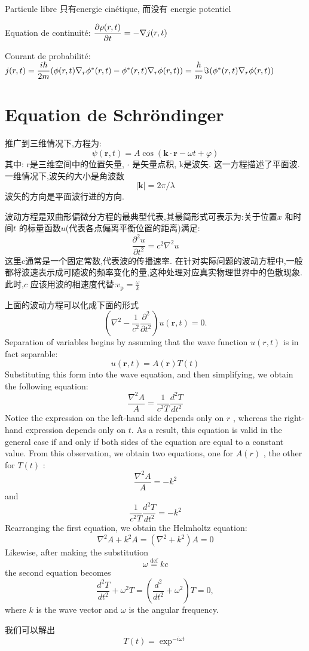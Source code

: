 \documentclass{article}
\begin{document}
Particule libre 只有energie cin\'etique, 而没有 energie potentiel

Equation de continuit\'e: $\dfrac{\partial \rho(r,t)}{\partial t} = - \nabla j(r,t)$

Courant de probabilit\'e: $j(r,t) = \dfrac{i\hbar}{2m} (\phi(r,t) \nabla _r{\phi^*(r,t)} - \phi^*(r,t) \nabla _r{\phi(r,t)}) = \dfrac{\hbar}{m} \Im{(\phi^*(r,t) \nabla _r{\phi(r,t)})} $

\section{Equation de Schr\"ondinger}
推广到三维情况下,方程为:
$$
\psi \left({\mathbf r}, t \right) = A \cos \left({\mathbf k} \cdot {\mathbf r} - \omega t + \varphi \right)
$$
其中:
r是三维空间中的位置矢量,
$\cdot$ 是矢量点积,
k是波矢.
这一方程描述了平面波.一维情况下,波矢的大小是角波数
$$|{\mathbf k}| = 2\pi/\lambda$$
波矢的方向是平面波行进的方向.

波动方程是双曲形偏微分方程的最典型代表,其最简形式可表示为:关于位置$x$ 和时间$t$ 的标量函数$u$(代表各点偏离平衡位置的距离)满足:
$$
\dfrac{\partial^2 u}{\partial t^2} = c^2 \nabla^2u
$$
这里c通常是一个固定常数,代表波的传播速率.
在针对实际问题的波动方程中,一般都将波速表示成可随波的频率变化的量,这种处理对应真实物理世界中的色散现象.此时,$ c$  应该用波的相速度代替:$v_\mathrm{p} = \frac{\omega}{k}$

上面的波动方程可以化成下面的形式
$$
\left(\nabla^2-\frac{1}{c^2}\frac{\partial^2}{\partial{t}^2}\right)u(\mathbf{r},t)=0.
$$
Separation of variables begins by assuming that the wave function $u(r, t)$ is in fact separable:
$$u(\mathbf{r},t)=A (\mathbf{r}) T(t)$$
Substituting this form into the wave equation, and then simplifying, we obtain the following equation:
$$\dfrac{\nabla^2 A}{A} = \dfrac{1}{c^2 T } \dfrac{d^2 T}{d t^2}$$
Notice the expression on the left-hand side depends only on $r$ , whereas the right-hand expression depends only on $t$.
As a result, this equation is valid in the general case if and only if both sides of the equation are equal to a constant value.
From this observation, we obtain two equations, one for $A(r)$ , the other for $T(t)$ :
$$\dfrac{\nabla^2 A}{A} = -k^2$$
and
$$\dfrac{1}{c^2 T } \dfrac{d^2 T}{d t^2} = -k^2$$
Rearranging the first equation, we obtain the Helmholtz equation:
$$\nabla^2 A + k^2 A  =  ( \nabla^2 + k^2)  A  =  0$$
Likewise, after making the substitution
$$ \omega  \stackrel{\mathrm{def}}{=}  kc $$
the second equation becomes
$$\frac{d^2{T}}{d{t}^2} + \omega^2T  =  \left( \dfrac{d^2 }{dt^2 } + \omega^2 \right) T  =  0,$$
where $k$ is the wave vector and $\omega$ is the angular frequency.\par
我们可以解出
$$
T(t) = \exp^{-i \omega t}
$$
\end{document}

